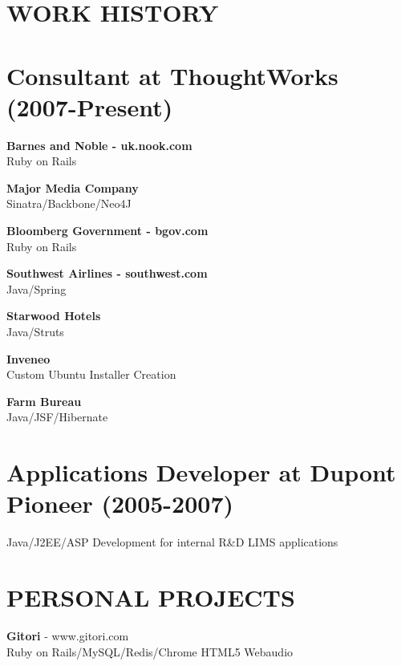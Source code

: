 \documentclass{res}
\begin{document}
 


\address{udit.manektala.com \\  uditmanektala@gmail.com \\  (515) 770-2500}        
                                  
\begin{resume}

\section{WORK HISTORY}          
\section {Consultant at ThoughtWorks (2007-Present)}
{\bf Barnes and Noble - uk.nook.com}
\\Ruby on Rails

{\bf Major Media Company}
\\Sinatra/Backbone/Neo4J

{\bf Bloomberg Government - bgov.com}
\\Ruby on Rails

{\bf Southwest Airlines - southwest.com}
\\Java/Spring

{\bf Starwood Hotels}
\\Java/Struts

{\bf Inveneo}
\\Custom Ubuntu Installer Creation

{\bf Farm Bureau}
\\Java/JSF/Hibernate
 
\section {Applications Developer at Dupont Pioneer (2005-2007)}
Java/J2EE/ASP Development for internal R\&D LIMS applications

\section{PERSONAL PROJECTS}          
    {\bf Gitori}  - www.gitori.com
     \\Ruby on Rails/MySQL/Redis/Chrome HTML5 Webaudio


\end{resume}
\end{document}
